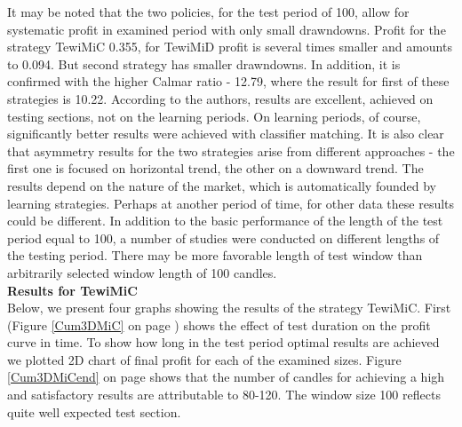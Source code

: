 \documentclass{tewiart}
\begin{document}
It may be noted that the two policies, for the test period of 100, allow for systematic profit in examined period with only small drawndowns. Profit for the strategy TewiMiC 0.355, for TewiMiD profit is several times smaller and amounts to 0.094. But second strategy has smaller drawndowns. In addition, it is confirmed with the higher Calmar ratio - 12.79, where the result for first of these strategies is 10.22. According to the authors, results are excellent, achieved on testing sections, not on the learning periods. On learning periods, of course, significantly better results were achieved with classifier matching. It is also clear that asymmetry results for the two strategies arise from different approaches - the first one is focused on horizontal trend, the other on a downward trend. The results depend on the nature of the market, which is automatically founded by learning strategies. Perhaps at another period of time, for other data these results could be different. In addition to the basic performance of the length of the test period equal to 100, a number of studies were conducted on different lengths of the testing period. There may be more favorable length of test window than arbitrarily selected window length of 100 candles.\\

\textbf{Results for TewiMiC}\\
Below, we present four graphs showing the results of the strategy TewiMiC. First (Figure \ref{Cum3DMiC} on page \pageref{Cum3DMiC}) shows the effect of test duration on the profit curve in time. To show how long in the test period optimal results are achieved we plotted 2D chart of final profit for each of the examined sizes. Figure \ref{Cum3DMiCend} on page \pageref{Cum3DMiCend} shows that the number of candles for achieving a high and satisfactory results are attributable to 80-120. The window size 100 reflects quite well expected test section.
\end{document}
